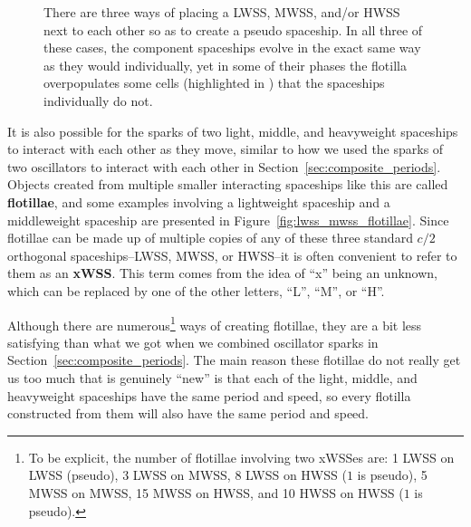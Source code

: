 \begin{figure}[!htb]
	\centering
	\caption{There are three ways of placing a LWSS, MWSS, and/or HWSS next to each other so as to create a pseudo spaceship. In all three of these cases, the component spaceships evolve in the exact same way as they would individually, yet in some of their phases the flotilla overpopulates some cells (highlighted in ) that the spaceships individually do not.}\label{fig:lwss_hwss_pseudo}
\end{figure}

It is also possible for the sparks of two light, middle, and heavyweight spaceships to interact with each other as they move, similar to how we used the sparks of two oscillators to interact with each other in Section~\ref{sec:composite_periods}. Objects created from multiple smaller interacting spaceships like this are called \textbf{flotillae}, and some examples involving a lightweight spaceship and a middleweight spaceship are presented in Figure~\ref{fig:lwss_mwss_flotillae}. Since flotillae can be made up of multiple copies of any of these three standard $c/2$ orthogonal spaceships--LWSS, MWSS, or HWSS--it is often convenient to refer to them as an \textbf{xWSS}. This term comes from the idea of ``x'' being an unknown, which can be replaced by one of the other letters, ``L'', ``M'', or ``H''.

Although there are numerous\footnote{To be explicit, the number of flotillae involving two xWSSes are: 1 LWSS on LWSS (pseudo), 3 LWSS on MWSS, 8 LWSS on HWSS ($1$ is pseudo), 5 MWSS on MWSS, 15 MWSS on HWSS, and 10 HWSS on HWSS ($1$ is pseudo).} ways of creating flotillae, they are a bit less satisfying than what we got when we combined oscillator sparks in Section~\ref{sec:composite_periods}. The main reason these flotillae do not really get us too much that is genuinely ``new'' is that each of the light, middle, and heavyweight spaceships have the same period and speed, so every flotilla constructed from them will also have the same period and speed.


